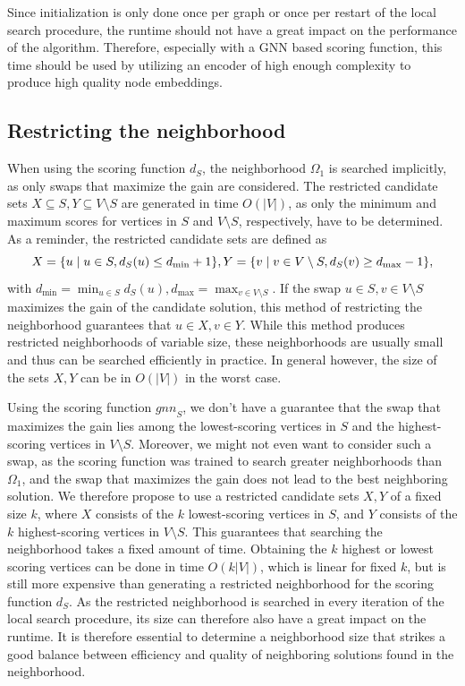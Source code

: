 \documentclass[draft,final]{vutinfth} %
\begin{document}
Since initialization is only done once per graph or once per restart of the local search procedure, the runtime should not have a great impact on the performance of the algorithm. Therefore, especially with a GNN based scoring function, this time should be used by utilizing an encoder of high enough complexity to produce high quality node embeddings. 

\subsection{Restricting the neighborhood}
When using the scoring function $d_S$, the neighborhood $\Omega_1$ is searched implicitly, as only swaps that maximize the gain are considered. 
The restricted candidate sets $X \subseteq S, Y \subseteq V \setminus S$ are generated in time $O(|V|)$, as only the minimum and maximum scores for vertices in $S$ and $V \setminus S$, respectively, have to be determined. As a reminder, the restricted candidate sets are defined as 
\[
    X = \{ u \mid u \in S, d_S(u) \leq d_{\min} + 1 \}, \\
    Y = \{ v \mid v \in V \setminus S, d_S(v) \geq d_{\max} - 1 \},
\]
with $d_{\min} = \min_{u \in S} d_S(u), d_{\max} = \max_{v \in V \setminus S}$. 
If the swap $u \in S,v \in V \setminus S$ maximizes the gain of the candidate solution, this method of restricting the neighborhood guarantees that $u \in X, v \in Y$.
While this method produces restricted neighborhoods of variable size, these neighborhoods are usually small and thus can be searched efficiently in practice. In general however, the size of the sets $X, Y$ can be in $O(|V|)$ in the worst case. 

Using the scoring function $\mathit{gnn}_S$, we don't have a guarantee that the swap that maximizes the gain lies among the lowest-scoring vertices in $S$ and the highest-scoring vertices in $V \setminus S$. Moreover, we might not even want to consider such a swap, as the scoring function was trained to search greater neighborhoods than $\Omega_1$, and the swap that maximizes the gain does not lead to the best neighboring solution. We therefore propose to use a restricted candidate sets $X,Y$ of a fixed size $k$, where $X$ consists of the $k$ lowest-scoring vertices in $S$, and $Y$ consists of the $k$ highest-scoring vertices in $V \setminus S$. This guarantees that searching the neighborhood takes a fixed amount of time. 
Obtaining the $k$ highest or lowest scoring vertices can be done in time $O(k |V|)$, which is linear for fixed $k$, but is still more expensive than generating a restricted neighborhood for the scoring function $d_S$. As the restricted neighborhood is searched in every iteration of the local search procedure, its size can therefore also have a great impact on the runtime. It is therefore essential to determine a neighborhood size that strikes a good balance between efficiency and quality of neighboring solutions found in the neighborhood.  
\end{document}
